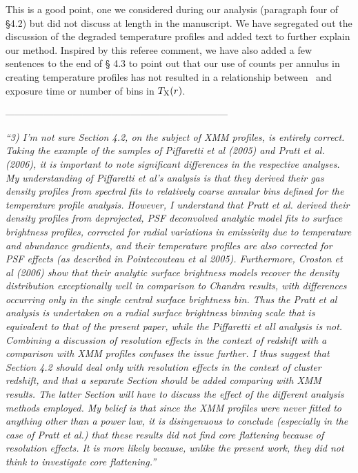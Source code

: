 \documentclass[11pt]{article}
\begin{document}
This is a good point, one we considered during our analysis (paragraph
four of \S 4.2) but did not discuss at length in the manuscript. We
have segregated out the discussion of the degraded temperature
profiles and added text to further explain our method. Inspired by this
referee comment, we have also added a few sentences to the end of \S
4.3 to point out that our use of counts per annulus in creating
temperature profiles has not resulted in a relationship between
\kna\ and exposure time or number of bins in $T_{\mathrm{X}}(r)$.

---------------------------------------------------------------------

{\it{``3) I'm not sure Section 4.2, on the subject of XMM profiles, is
    entirely correct. Taking the example of the samples of Piffaretti
    et al (2005) and Pratt et al. (2006), it is important to note
    significant differences in the respective analyses. My
    understanding of Piffaretti et al's analysis is that they derived
    their gas density profiles from spectral fits to relatively coarse
    annular bins defined for the temperature profile analysis.
    However, I understand that Pratt et al. derived their density
    profiles from deprojected, PSF deconvolved analytic model fits to
    surface brightness profiles, corrected for radial variations in
    emissivity due to temperature and abundance gradients, and their
    temperature profiles are also corrected for PSF effects (as
    described in Pointecouteau et al 2005). Furthermore, Croston et al
    (2006) show that their analytic surface brightness models recover
    the density distribution exceptionally well in comparison to
    Chandra results, with differences occurring only in the single
    central surface brightness bin. Thus the Pratt et al analysis is
    undertaken on a radial surface brightness binning scale that is
    equivalent to that of the present paper, while the Piffaretti et
    all analysis is not.  Combining a discussion of resolution effects
    in the context of redshift with a comparison with XMM profiles
    confuses the issue further. I thus suggest that Section 4.2 should
    deal only with resolution effects in the context of cluster
    redshift, and that a separate Section should be added comparing
    with XMM results. The latter Section will have to discuss the
    effect of the different analysis methods employed. My belief is
    that since the XMM profiles were never fitted to anything other
    than a power law, it is disingenuous to conclude (especially in
    the case of Pratt et al.) that these results did not find core
    flattening because of resolution effects. It is more likely
    because, unlike the present work, they did not think to
    investigate core flattening.''}}
\end{document}
